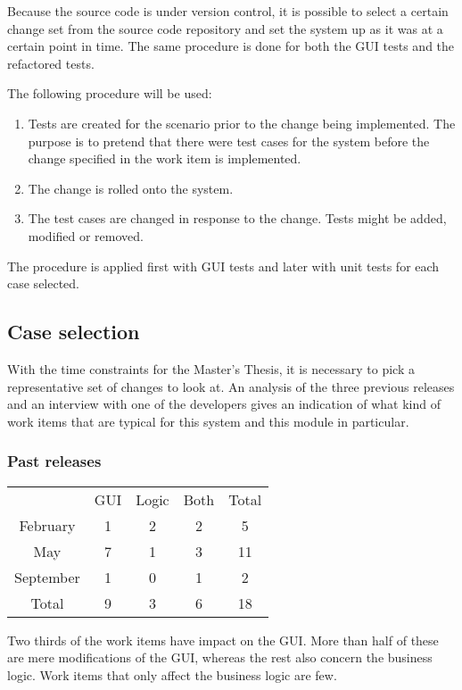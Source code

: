 \documentclass{article}
\begin{document}
		Because the source code is under version control, it is possible to select a certain change set from the source code repository and set the system up as it was at a certain point in time.
		The same procedure is done for both the GUI tests and the refactored tests.

		The following procedure will be used:

		\begin{enumerate}
			\item  Tests are created for the scenario prior to the change being implemented. The purpose is to pretend that there were test cases for the system before the change specified in the work item is implemented.
			\item The change is rolled onto the system.
			\item The test cases are changed in response to the change. Tests might be added, modified or removed.
		\end{enumerate}

		The procedure is applied first with GUI tests and later with unit tests for each case selected.

		\subsection{Case selection}
		With the time constraints for the Master's Thesis, it is necessary to pick a representative set of changes to look at.
		An analysis of the three previous releases and an interview with one of the developers gives an indication of what kind of work items that are typical for this system and this module in particular.

		\subsubsection{Past releases}
		
		\begin{tabular}{ c | c c c | c}
					 	& GUI & Logic & Both & Total\\
			February 	& 1 	& 2 	& 2 	& 5\\
			May 		& 7 	& 1 	& 3 	& 11\\
			September 	& 1 	& 0 	& 1 	& 2\\
			\hline
			Total 		& 9 	& 3 	& 6 	& 18\\
		\end{tabular}


		Two thirds of the work items have impact on the GUI. More than half of these are mere modifications of the GUI, whereas the rest also concern the business logic. Work items that only affect the business logic are few.
\end{document}
